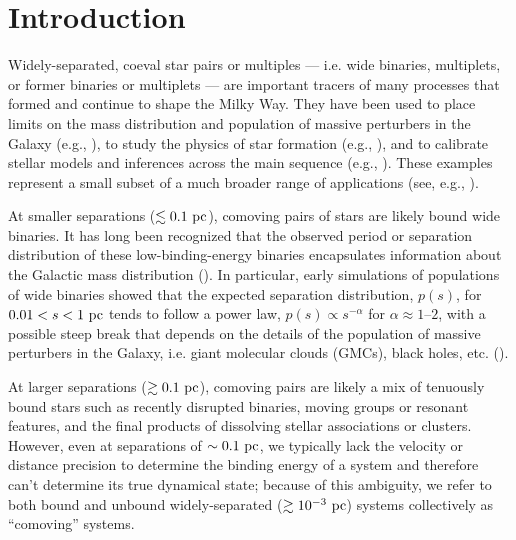 \documentclass[modern, letterpaper]{aastex61}
\begin{document}


\section{Introduction}\label{sec:introduction}

Widely-separated, coeval star pairs or multiples --- i.e. wide binaries,
multiplets, or former binaries or multiplets --- are important tracers of many
processes that formed and continue to shape the Milky Way.
They have been used to place limits on the mass distribution and population of
massive perturbers in the Galaxy (e.g.,
\citealt{Yoo:2004,Monroy-Rodriguez:2014}), to study the physics of star
formation (e.g., \citealt{Parker:2009,Reipurth:2012}), and to calibrate stellar
models and inferences across the main sequence (e.g., \citealt{Brewer:2016}).
These examples represent a small subset of a much broader range of applications
(see, e.g., \citealt{Chaname:2007}).

At smaller separations ($\lesssim 0.1~\mathrm{pc}$), comoving pairs of stars are likely
bound wide binaries.
It has long been recognized that the observed period or separation distribution
of these low-binding-energy binaries encapsulates information about the
Galactic mass distribution (\citealt{Opik:1924,Oort:1950,Bahcall:1985}).
In particular, early simulations of populations of wide binaries showed that
the expected separation distribution, $p(s)$, for $0.01 < s < 1~\mathrm{pc}$ tends to
follow a power law, $p(s) \propto s^{-\alpha}$ for $\alpha \approx 1$--$2$,
with a possible steep break that depends on the details of the population of
massive perturbers in the Galaxy, i.e. giant molecular clouds (GMCs), black
holes, etc. (\citealt{Weinberg:1987}).

At larger separations ($\gtrsim 0.1~\mathrm{pc}$), comoving pairs are likely a mix of
tenuously bound stars such as recently disrupted binaries, moving groups or resonant
features, and the final products of dissolving stellar associations or
clusters.
However, even at separations of $\sim 0.1~\mathrm{pc}$, we typically lack the velocity
or distance precision to determine the binding energy of a system and therefore
can't determine its true dynamical state; because of this ambiguity, we refer to
both bound and unbound widely-separated ($\gtrsim 10^{-3}~\mathrm{pc}$) systems
collectively as ``comoving'' systems.
\end{document}

